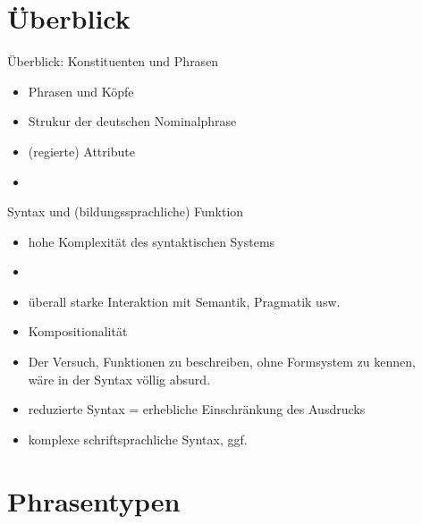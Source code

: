 

\section{Überblick}

\begin{frame}
  {Überblick: Konstituenten und Phrasen}
  \pause
  \begin{itemize}[<+->]
    \item Phrasen und Köpfe
    \item Strukur der deutschen \alert{Nominalphrase}
    \item (regierte) Attribute
      \Zeile
    \item \citet[Abschnitt~12.3]{Schaefer2018b}
  \end{itemize}
\end{frame}

\begin{frame}
  {Syntax und (bildungssprachliche) Funktion}
  \pause
  \begin{itemize}[<+->]
    \item \alert{hohe Komplexität} des syntaktischen Systems
    \item {}
    \item überall \alert{starke Interaktion mit Semantik, Pragmatik usw.}
    \item \alert{Kompositionalität}
      \Zeile
    \item Der Versuch, Funktionen zu beschreiben, ohne Formsystem zu kennen,\\
      wäre in der Syntax völlig absurd.
      \Zeile
    \item reduzierte Syntax = erhebliche Einschränkung des Ausdrucks
    \item komplexe schriftsprachliche Syntax, ggf.\ 
  \end{itemize}
\end{frame}


\section{Phrasentypen}

